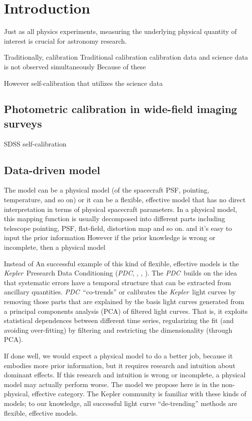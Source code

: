 \documentclass[12pt, preprint]{aastex}
\newcommand{\project}[1]{\textsl{#1}}
\newcommand{\kepler}{\project{Kepler}}
\newcommand{\pdc}{\project{PDC}}
\begin{document}
\section{Introduction}
Just as all physics experiments, measuring the underlying physical quantity of interest is crucial for astronomy research.

Traditionally, calibration 
Traditional calibration
calibration data and science data is not observed simultaneously
Because of these 

However self-calibration that utilizes the science data

\subsection{Photometric calibration in wide-field imaging surveys}
SDSS self-calibration 

\subsection{Data-driven model}
The model can be a physical model (of the spacecraft PSF, pointing, temperature, and so on) or it can be a flexible, effective model that has no direct interpretation in terms of physical spacecraft parameters.
In a physical model, this mapping function is usually decomposed into different parts including telescope pointing, PSF, flat-field, distortion map and so on.
 and it's easy to input the prior information 
However if the prior knowledge is wrong or incomplete, then a physical model 

Instead of 
An successful example of this kind of flexible, effective models is the \kepler\ Presearch Data Conditioning (\pdc, \citealt{pdc1}, \citealt{pdc2}, \citealt{pdc3}). 
The \pdc\ builds on the idea that systematic errors have a temporal structure that can be extracted from ancillary quantities.
\pdc\ ``co-trends'' or calibrates the \kepler\ light curves by removing those parts that are explained by the basis light curves generated from a principal components analysis (PCA) of filtered light curves.
That is, it exploits statistical dependences between different time series, regularizing the fit (and avoiding over-fitting) by filtering and restricting the dimensionality (through PCA).


If done well, we would expect a physical model to do a better job, because it embodies more prior information, but it requires research and intuition about dominant effects. 
If this research and intuition is wrong or incomplete, a physical model may actually perform worse. The model we propose here is in the non-physical, effective category. The Kepler community is familiar with these kinds of models; to our knowledge, all successful light curve “de-trending” methods are flexible, effective models.
\end{document}
